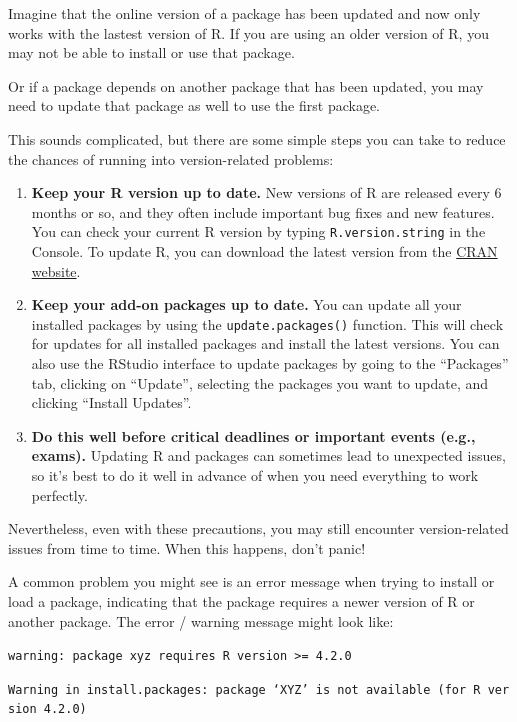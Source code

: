 \documentclass[
  letterpaper,
  8pt,
  a4paper]{book}
\begin{document}
Imagine that the online version of a package has been updated and now
only works with the lastest version of R. If you are using an older
version of R, you may not be able to install or use that package.

Or if a package depends on another package that has been updated, you
may need to update that package as well to use the first package.

This sounds complicated, but there are some simple steps you can take to
reduce the chances of running into version-related problems:

\begin{enumerate}
\def\labelenumi{\arabic{enumi}.}
\item
  \textbf{Keep your R version up to date.} New versions of R are
  released every 6 months or so, and they often include important bug
  fixes and new features. You can check your current R version by typing
  \texttt{R.version.string} in the Console. To update R, you can
  download the latest version from the
  \href{https://cran.r-project.org/}{CRAN website}.
\item
  \textbf{Keep your add-on packages up to date.} You can update all your
  installed packages by using the \texttt{update.packages()} function.
  This will check for updates for all installed packages and install the
  latest versions. You can also use the RStudio interface to update
  packages by going to the ``Packages'' tab, clicking on ``Update'',
  selecting the packages you want to update, and clicking ``Install
  Updates''.
\item
  \textbf{Do this well before critical deadlines or important events
  (e.g., exams).} Updating R and packages can sometimes lead to
  unexpected issues, so it's best to do it well in advance of when you
  need everything to work perfectly.
\end{enumerate}

Nevertheless, even with these precautions, you may still encounter
version-related issues from time to time. When this happens, don't
panic!

A common problem you might see is an error message when trying to
install or load a package, indicating that the package requires a newer
version of R or another package. The error / warning message might look
like:

\texttt{warning:\ package\ \textquotesingle{}xyz\textquotesingle{}\ requires\ R\ version\ \textgreater{}=\ 4.2.0}

\texttt{Warning\ in\ install.packages:\ package\ ‘XYZ’\ is\ not\ available\ (for\ R\ version\ 4.2.0)}
\end{document}
